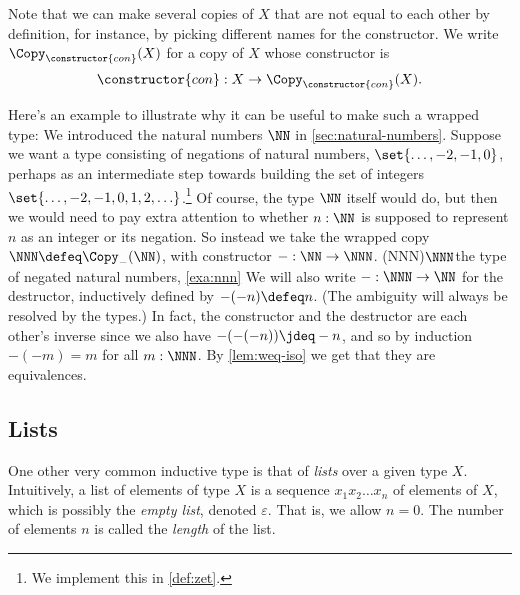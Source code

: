 Note that we can make several copies of $X$ that are not
equal to each other by definition,
for instance, by picking different names for the constructor.
We write $\Copy_{\constructor{con}}(X)$ for a copy of $X$
whose constructor is
\[
  \constructor{con} : X \to \Copy_{\constructor{con}}(X).
\]

\begin{example}\label{exa:nnn}
Here's an example to illustrate why it can be useful to make such a wrapped type:
We introduced the natural numbers $\NN$ in \cref{sec:natural-numbers}.
Suppose we want a type consisting of negations of natural numbers,
$\set{\ldots, -2, -1,0}$,
perhaps as an intermediate step towards building the set of integers
$\set{\ldots, -2, -1,0,1,2,\ldots}$.\footnote{%
  We implement this in \cref{def:zet}.}
Of course, the type $\NN$ itself would do,
but then we would need to pay extra attention to whether $n:\NN$
is supposed to represent $n$ as an integer or its negation.
So instead we take the wrapped copy $\NNN\defeq\Copy_{-}(\NN)$,
with constructor ${-} : \NN \to \NNN$.%
\glossary(NNN){$\protect\NNN$}{the type of negated natural numbers,
  \cref{exa:nnn}}
We will also write ${-} : \NNN \to \NN$ for the destructor,
inductively defined by $-(-n)\defeq n$. (The ambiguity will
always be resolved by the types.) In fact, the constructor
and the destructor are each other's inverse since we
also have $-(-(-n))\jdeq -n$, and so by induction $-(-m) = m$ for all $m:\NNN$.
By \cref{lem:weq-iso} we get that they are equivalences.
\end{example}

\subsection{Lists}\label{sec:lists}

One other very common inductive type is that of \emph{lists}
over a given type $X$.
Intuitively, a list of elements of type $X$ is a
sequence $x_1x_2\ldots x_n$ of elements of $X$,
which is possibly the \emph{empty list}, denoted $\varepsilon$.
That is, we allow $n=0$.
The number of elements $n$ is called the \emph{length} of the list.

